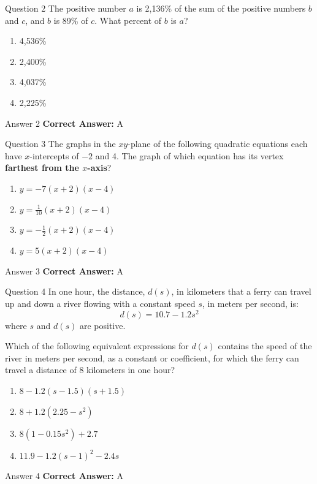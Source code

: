 \documentclass{beamer}
\begin{document}
\begin{frame}{Question 2}
\small
The positive number \(a\) is 2,136\% of the sum of the positive numbers \(b\) and \(c\),
and \(b\) is 89\% of \(c\). What percent of \(b\) is \(a\)?
\vspace{0.35cm}
\begin{enumerate}
    \item[A.] 4,536\%
    \item[B.] 2,400\%
    \item[C.] 4,037\%
    \item[D.] 2,225\%
\end{enumerate}
\end{frame}
\begin{frame}{Answer 2}
\small
\textbf{Correct Answer:} A
\end{frame}

\begin{frame}{Question 3}
\small
The graphs in the \(xy\)-plane of the following quadratic equations each have
\(x\)-intercepts of \(-2\) and 4. The graph of which equation has its vertex
\textbf{farthest from the \(x\)-axis}?
\vspace{0.35cm}
\begin{enumerate}
    \item[A.] \(y = -7(x + 2)(x - 4)\)
    \item[B.] \(y = \frac{1}{10}(x + 2)(x - 4)\)
    \item[C.] \(y = -\frac{1}{2}(x + 2)(x - 4)\)
    \item[D.] \(y = 5(x + 2)(x - 4)\)
\end{enumerate}
\end{frame}
\begin{frame}{Answer 3}
\small
\textbf{Correct Answer:} A
\end{frame}

\begin{frame}{Question 4}
\small
In one hour, the distance, \(d(s)\), in kilometers that a ferry can travel up and down a river
flowing with a constant speed \(s\), in meters per second, is:
\[
d(s) = 10.7 - 1.2s^2
\]
where \(s\) and \(d(s)\) are positive.

Which of the following equivalent expressions for \(d(s)\) contains the speed
of the river in meters per second, as a constant or coefficient, for which
the ferry can travel a distance of 8 kilometers in one hour?
\vspace{0.35cm}
\begin{enumerate}
    \item[A.] \(8 - 1.2(s - 1.5)(s + 1.5)\)
    \item[B.] \(8 + 1.2(2.25 - s^2)\)
    \item[C.] \(8(1 - 0.15s^2) + 2.7\)
    \item[D.] \(11.9 - 1.2(s - 1)^2 - 2.4s\)
\end{enumerate}
\end{frame}
\begin{frame}{Answer 4}
\small
\textbf{Correct Answer:} A
\end{frame}
\end{document}
